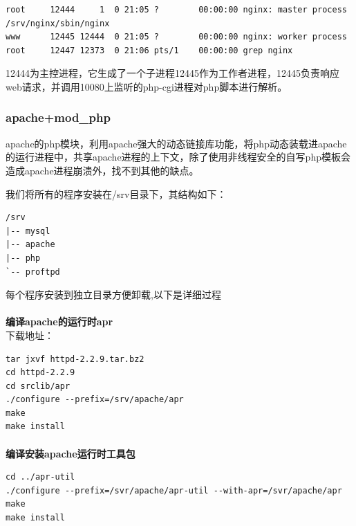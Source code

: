 \documentclass{article}
\begin{document}
\begin{verbatim}
root     12444     1  0 21:05 ?        00:00:00 nginx: master process /srv/nginx/sbin/nginx
www      12445 12444  0 21:05 ?        00:00:00 nginx: worker process
root     12447 12373  0 21:06 pts/1    00:00:00 grep nginx
\end{verbatim}
12444为主控进程，它生成了一个子进程12445作为工作者进程，12445负责响应web请求，并调用10080上监听的php-cgi进程对php脚本进行解析。

\hypertarget{toc6}{}
\subsubsection{apache+mod\_php}
apache的php模块，利用apache强大的动态链接库功能，将php动态装载进apache的运行进程中，共享apache进程的上下文，除了使用非线程安全的自写php模板会造成apache进程崩溃外，找不到其他的缺点。

我们将所有的程序安装在/srv目录下，其结构如下：

\begin{verbatim}
/srv
|-- mysql
|-- apache
|-- php
`-- proftpd
\end{verbatim}

每个程序安装到独立目录方便卸载,以下是详细过程

\paragraph{}\textbf{编译apache的运行时apr}\\

下载地址：


\begin{verbatim}
tar jxvf httpd-2.2.9.tar.bz2
cd httpd-2.2.9
cd srclib/apr 
./configure --prefix=/srv/apache/apr 
make 
make install
\end{verbatim}

\paragraph{}\textbf{编译安装apache运行时工具包}\\

\begin{verbatim}
cd ../apr-util
./configure --prefix=/svr/apache/apr-util --with-apr=/svr/apache/apr
make
make install
\end{verbatim}
\end{document}
